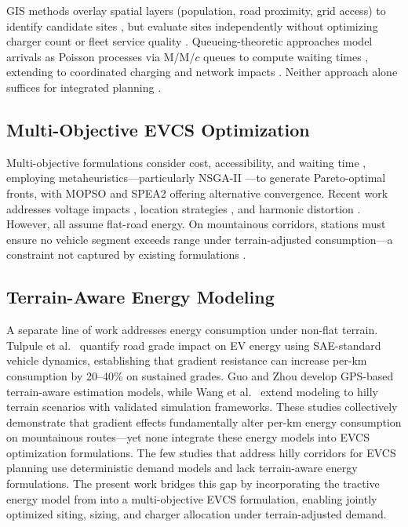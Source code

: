 \documentclass[conference]{IEEEtran}
\begin{document}
GIS methods overlay spatial layers (population, road proximity, grid access) to identify candidate sites \cite{13,23,24}, but evaluate sites independently without optimizing charger count or fleet service quality \cite{25}. Queueing-theoretic approaches model arrivals as Poisson processes via M/M/$c$ queues to compute waiting times \cite{19}, extending to coordinated charging \cite{26} and network impacts \cite{27}. Neither approach alone suffices for integrated planning \cite{28}.

\subsection{Multi-Objective EVCS Optimization}

Multi-objective formulations consider cost, accessibility, and waiting time \cite{14,15,16}, employing metaheuristics---particularly NSGA-II \cite{20}---to generate Pareto-optimal fronts, with MOPSO \cite{21} and SPEA2 \cite{22} offering alternative convergence. Recent work addresses voltage impacts \cite{27}, location strategies \cite{28}, and harmonic distortion \cite{29}. However, all assume flat-road energy. On mountainous corridors, stations must ensure no vehicle segment exceeds range under terrain-adjusted consumption---a constraint not captured by existing formulations \cite{10,11,12}.

\subsection{Terrain-Aware Energy Modeling}

A separate line of work addresses energy consumption under non-flat terrain. Tulpule et al.~\cite{10} quantify road grade impact on EV energy using SAE-standard vehicle dynamics, establishing that gradient resistance can increase per-km consumption by 20--40\% on sustained grades. Guo and Zhou \cite{11} develop GPS-based terrain-aware estimation models, while Wang et al.~\cite{12} extend modeling to hilly terrain scenarios with validated simulation frameworks. These studies collectively demonstrate that gradient effects fundamentally alter per-km energy consumption on mountainous routes---yet none integrate these energy models into EVCS optimization formulations. The few studies that address hilly corridors for EVCS planning \cite{17} use deterministic demand models and lack terrain-aware energy formulations. The present work bridges this gap by incorporating the tractive energy model from \cite{10} into a multi-objective EVCS formulation, enabling jointly optimized siting, sizing, and charger allocation under terrain-adjusted demand.
\end{document}
